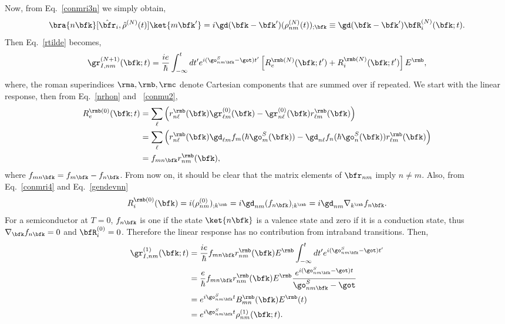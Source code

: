 \documentclass[floatfix,prb,aps,superscriptaddress,11pt,preprint,letterpaper]{revtex4}
\begin{document}
 Now, from Eq.~\eqref{conmri3n} we simply obtain,
\begin{equation}\label{conmri4}
\bra{n\bfk}[\hat\bfr_i,\hat\rho^{(N)}(t)]\ket{m\bfk'}
=i \gd(\bfk-\bfk') (\rho^{(N)}_{nm}(t))_{;\bfk}
\equiv \gd(\bfk-\bfk')\bfR_i^{(N)}(\bfk;t)
.
\end{equation}
Then Eq.~\eqref{rtilde} becomes,
\begin{equation}\label{rtilde2}
\gr^{(N+1)}_{I,nm}(\bfk;t)
=\frac{ie}{\hbar}\int_{-\infty}^t dt'
e^{i(\go^S_{nm\bfk}-\got)t'}
\left[R_e^{\rmb(N)}(\bfk;t')+R_i^{\rmb(N)}(\bfk;t')\right]E^{\rmb}
,
\end{equation}
 where, the roman superindices
$\rma,\rmb,\rmc$ denote Cartesian components that are summed over if repeated.
We start with the linear response, 
 then from Eq.~\eqref{nrhon} and ~\eqref{conmu2},
\begin{align}\label{R0e}
R_e^{\rmb(0)}(\bfk;t)
&=
\sum_{\ell}
\left(
r^{\rmb}_{n\ell}(\bfk)
\gr^{(0)}_{\ell m}(\bfk)
-
\gr^{(0)}_{n\ell}(\bfk)
r^{\rmb}_{\ell m}(\bfk)
\right)
\nonumber \\
&=
\sum_{\ell}
\left(
r^{\rmb}_{n\ell}(\bfk)
\gd_{\ell m}f_m(\hbar\go^S_m(\bfk))
-
\gd_{n\ell}f_n(\hbar\go^S_n(\bfk))
r^{\rmb}_{\ell m}(\bfk)
\right)
\nonumber \\
&=
f_{mn\bfk}
r^{\rmb}_{nm}(\bfk)
,
\end{align}
where $f_{mn\bfk}=f_{m\bfk}-f_{n\bfk}$.
From now on,
  it should be clear that the matrix elements of $\bfr_{nm}$ imply
 $n\neq m$.
Also, from Eq.~\eqref{conmri4} and Eq.~\eqref{gendevnn}
\begin{equation}\label{R0i}
R_i^{\rmb(0)}(\bfk)=i(\rho^{(0)}_{nm})_{;k^{\rmb}}=i\gd_{nm}(f_{n\bfk})_{;k^{\rmb}}=i\gd_{nm}\nabla_{k^{\rmb}} f_{n\bfk}
.
\end{equation}
For a semiconductor at $T=0$, $f_{n\bfk}$ is one if the state
$\ket{n\bfk}$ is a valence state and zero if it is a conduction state,
thus $\nabla_\bfk f_{n\bfk}=0$ and $\bfR_i^{(0)}=0$. 
Therefore
the linear response has no contribution from
intraband transitions.
 Then,
\begin{align}\label{rtilde2n}
\gr^{(1)}_{I,nm}(\bfk;t)
&=\frac{ie}{\hbar}
f_{mn\bfk}
r^{\rmb}_{nm}(\bfk)E^{\rmb}
\int_{-\infty}^t dt'
e^{i(\go^S_{nm\bfk}-\got)t'}
\nonumber \\
&=\frac{e}{\hbar}
f_{mn\bfk}
r^{\rmb}_{nm}(\bfk)E^{\rmb}
\frac{e^{i(\go^S_{nm\bfk}-\got)t}}
{\go^S_{nm\bfk}-\got}
\nonumber \\
&=
e^{i\go^S_{nm\bfk}t}
B^{\rmb}_{mn}(\bfk)E^{\rmb}(t)
\nonumber \\
&=
e^{i\go^S_{nm\bfk}t}
\rho^{(1)}_{nm}(\bfk;t)
.
\end{align}
\end{document}

